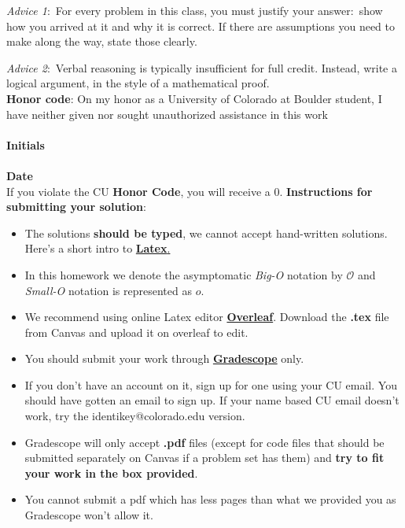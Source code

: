 \documentclass[12pt]{article}
\begin{document}
\begin{small}


\textit{Advice 1}:\ For every problem in this class, you must justify your answer:\ show how you arrived at it and why it is correct. If there are assumptions you need to make along the way, state those clearly.

\textit{Advice 2}:\ Verbal reasoning is typically insufficient for full credit. Instead, write a logical argument, in the style of a mathematical proof.\\

\textbf{Honor code}: On my honor as a University of Colorado at Boulder student,
I have neither given nor sought unauthorized assistance in this work\\  \\
\textbf{Initials} 
\fbox{%
\phantom{This is a really long name}} \\ \\
\textbf{Date} 
\fbox{%
\phantom{This is a really long name}} \\ 


If you violate the CU \textbf{Honor Code}, you will receive a 0.
\clearpage
\textbf{Instructions for submitting your solution}:
\vspace{-5mm} 

\begin{itemize}
	\item The solutions \textbf{should be typed}, we cannot accept hand-written solutions. Here's a short intro to \href{http://ece.uprm.edu/~caceros/latex/introduction.pdf}{\textbf{Latex}.}
	 \item In this homework we denote the asymptomatic \textit{Big-O} notation by $\mathcal{O}$ and \textit{Small-O} notation is represented as $o$. 
	\item We recommend using online Latex editor \href{https://www.overleaf.com/}{\textbf{Overleaf}}. Download the \textbf{.tex} file from Canvas and upload it on overleaf to edit.
	\item You should submit your work through \href{https://www.gradescope.com}{\textbf{Gradescope}}  only.
	\item If you don't have an account on it, sign up for one using your CU email. You should have gotten an email to sign up. If your name based CU email doesn't work, try the identikey@colorado.edu version. 
	\item Gradescope will only accept \textbf{.pdf} files (except for code files that should be submitted separately on Canvas if a problem set has them) and \textbf{try to fit your work in the box provided}. 
	\item You cannot submit a pdf which has less pages than what we provided you as Gradescope won't allow it.
   
\end{itemize}
\vspace{-4mm} 
\end{small}
\clearpage
\end{document}

